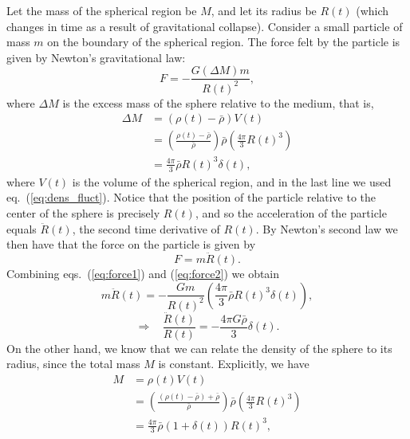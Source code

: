 \documentclass[11pt, a4paper,oneside,openright]{book}
\numberwithin{equation}{section}
\begin{document}
Let the mass of the spherical region be $M$, and let its radius be $R(t)$ (which changes in time as a result of gravitational collapse). Consider a small particle of mass $m$ on the boundary of the spherical region. The force felt by the particle is given by Newton's gravitational law:
\begin{equation} \label{eq:force1}
F=-\frac{G(\Delta M)m}{R(t)^2},
\end{equation}
where $\Delta M$ is the excess mass of the sphere relative to the medium, that is,
\begin{equation}
\begin{split}
\Delta M&=\left(\rho(t)-\bar{\rho}\right)V(t)\\
&=\left(\frac{\rho(t)-\bar{\rho}}{\bar{\rho}}\right)\bar{\rho}\left(\frac{4\pi}{3}R(t)^3\right)\\
&=\frac{4\pi}{3}\bar{\rho} R(t)^3\delta(t),
\end{split}
\end{equation}
where $V(t)$ is the volume of the spherical region, and in the last line we used eq.\ (\ref{eq:dens_fluct}). Notice that the position of the particle relative to the center of the sphere is precisely $R(t)$, and so the acceleration of the particle equals $\ddot{R}(t)$, the second time derivative of $R(t)$. By Newton's second law we then have that the force on the particle is given by
\begin{equation} \label{eq:force2}
F=m\ddot{R}(t).
\end{equation}
Combining eqs.\ (\ref{eq:force1}) and (\ref{eq:force2}) we obtain
\begin{equation}
m\ddot{R}(t)=-\frac{Gm}{R(t)^2}\left(\frac{4\pi}{3}\bar{\rho}R(t)^3\delta(t)\right),
\end{equation}
\begin{equation} \label{eq:grav_coll1}
\Rightarrow~~~~ \frac{\ddot{R}(t)}{R(t)}=-\frac{4\pi G\bar{\rho}}{3}\delta(t).
\end{equation}
On the other hand, we know that we can relate the density of the sphere to its radius, since the total mass $M$ is constant. Explicitly, we have
\begin{equation}
\begin{split}
M&= \rho(t)V(t)\\
&=\left(\frac{\left(\rho(t)-\bar{\rho}\right)+\bar{\rho}}{\bar{\rho}}\right)\bar{\rho}\left(\frac{4\pi}{3}R(t)^3\right)\\
&=\frac{4\pi}{3}\bar{\rho} \left(1+\delta(t)\right)R(t)^3,
\end{split}
\end{equation}
\end{document}
